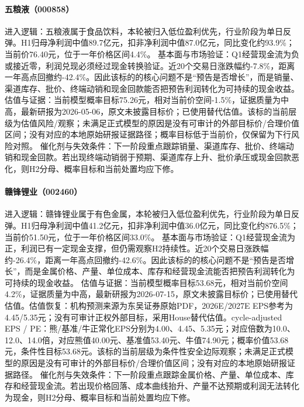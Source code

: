 \paragraph{五粮液（000858）}
进入逻辑：五粮液属于食品饮料，本轮被归入低位盈利优先，行业阶段为单日反弹。H1归母净利润中值89.7亿元，扣非净利润中值87.0亿元，同比变化约93.9\%；当前价76.40元，位于一年价格区间4.4\%。
基本面与市场验证：Q1经营现金流为负或接近零，利润兑现必须经过现金转换验证。近20个交易日涨跌幅约-7.8\%，距离一年高点回撤约-42.4\%。因此该标的的核心问题不是“预告是否增长”，而是销量、渠道库存、批价、终端动销和现金回款能否把预告利润转化为可持续的现金收益。
估值与证据：当前模型概率目标75.26元，相对当前价空间-1.5\%，证据质量为中高，最新研报为2026-05-06，原文未披露目标价；已使用替代估值。该标的当前层级为估值风险/观察；未满足正式模型的原因是没有可审计的外部目标价/合理价值区间；没有对应的本地原始研报证据路径；概率目标低于当前价，仅保留为下行风险对照。
催化剂与失效条件：下一阶段重点跟踪销量、渠道库存、批价、终端动销和现金回款。若出现终端动销弱于预期、渠道库存上升、批价承压或现金回款恶化，则H2分母、概率目标和当前处置均应下修。

\paragraph{赣锋锂业（002460）}
进入逻辑：赣锋锂业属于有色金属，本轮被归入低位盈利优先，行业阶段为单日反弹。H1归母净利润中值41.2亿元，扣非净利润中值36.0亿元，同比变化约876.5\%；当前价51.50元，位于一年价格区间33.0\%。
基本面与市场验证：Q1经营现金流为正，利润已有一定现金支撑，但仍需观察H2持续性。近20个交易日涨跌幅约-26.4\%，距离一年高点回撤约-42.6\%。因此该标的的核心问题不是“预告是否增长”，而是金属价格、产量、单位成本、库存和经营现金流能否把预告利润转化为可持续的现金收益。
估值与证据：当前模型概率目标53.68元，相对当前价空间4.2\%，证据质量为中高，最新研报为2026-07-15，原文未披露目标价；已使用替代估值。估值恢复：机构预测来源为东吴证券原始PDF，2026E/2027E EPS参考为4.45/5.35元；没有可审计正权外部目标，采用House替代估值。cycle-adjusted EPS / PE：熊/基准/牛正常化EPS分别为4.00、4.45、5.35元；对应倍数为10.0、12.0、14.0倍，对应熊值40.00元、基准值53.40元、牛值74.90元；概率价值53.68元，条件性目标53.68元。该标的当前层级为条件性安全边际观察；未满足正式模型的原因是没有可审计的外部目标价/合理价值区间；没有对应的本地原始研报证据路径。
催化剂与失效条件：下一阶段重点跟踪金属价格、产量、单位成本、库存和经营现金流。若出现价格回落、成本曲线抬升、产量不达预期或利润无法转化为现金，则H2分母、概率目标和当前处置均应下修。

